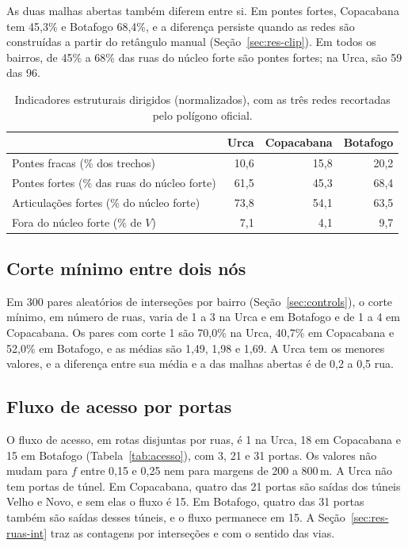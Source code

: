 As duas malhas abertas também diferem entre si. Em pontes fortes,
Copacabana tem 45,3\% e Botafogo 68,4\%, e a diferença persiste quando
as redes são construídas a partir do retângulo manual
(Seção~\ref{sec:res-clip}). Em todos os bairros, de 45\% a 68\% das
ruas do núcleo forte são pontes fortes; na Urca, são 59 das 96.

\begin{table}[t]
\centering
\caption{Indicadores estruturais dirigidos (normalizados), com as três
redes recortadas pelo polígono oficial.}
\label{tab:estrutural}
\begin{tabular}{lrrr}
\toprule
 & Urca & Copacabana & Botafogo \\
\midrule
Pontes fracas (\% dos trechos)          & 10,6 & 15,8 & 20,2 \\
Pontes fortes (\% das ruas do núcleo forte)   & 61,5 & 45,3 & 68,4 \\
Articulações fortes (\% do núcleo forte)      & 73,8 & 54,1 & 63,5 \\
Fora do núcleo forte (\% de $V$)        & 7,1  & 4,1  & 9,7 \\
\bottomrule
\end{tabular}
\end{table}

\subsection{Corte mínimo entre dois nós}
\label{sec:res-mincut}

Em 300 pares aleatórios de interseções por bairro
(Seção~\ref{sec:controls}), o corte mínimo, em número de ruas, varia de
1 a 3 na Urca e em Botafogo e de 1 a 4 em Copacabana. Os pares com corte
1 são 70,0\% na Urca, 40,7\% em Copacabana e 52,0\% em Botafogo, e as
médias são 1,49, 1,98 e 1,69. A Urca tem os menores valores, e a
diferença entre sua média e a das malhas abertas é de 0,2 a 0,5 rua.

\subsection{Fluxo de acesso por portas}
\label{sec:res-access}

O fluxo de acesso, em rotas disjuntas por ruas, é 1 na Urca, 18 em
Copacabana e 15 em Botafogo (Tabela~\ref{tab:acesso}), com 3, 21 e 31
portas. Os valores não mudam para $f$ entre 0,15 e 0,25 nem para
margens de 200 a 800\,m. A Urca não tem portas de túnel. Em Copacabana,
quatro das 21 portas são saídas dos túneis Velho e Novo, e sem elas o
fluxo é 15. Em Botafogo, quatro das 31 portas também são saídas desses
túneis, e o fluxo permanece em 15. A Seção~\ref{sec:res-ruas-int} traz
as contagens por interseções e com o sentido das vias.

